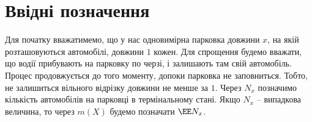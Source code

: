 \jointitles
\section{Ввідні позначення}

Для початку вважатимемо, що у нас одновимірна парковка довжини $x$, на якій розташовуються автомобілі, довжини $1$ кожен.
Для спрощення будемо вважати, що водії прибувають на парковку по черзі, і залишають там свій автомобіль. Процес продовжується до того моменту, допоки парковка не заповниться. Тобто, не залишиться вільного відрізку довжини не менше за $1$.
Через $N_{x}$ позначимо кількість автомобілів на парковці в термінальному стані. Якщо $N_{x}$ – випадкова величина, то через $m(X)$ будемо позначати $\EE N_{x}$.
